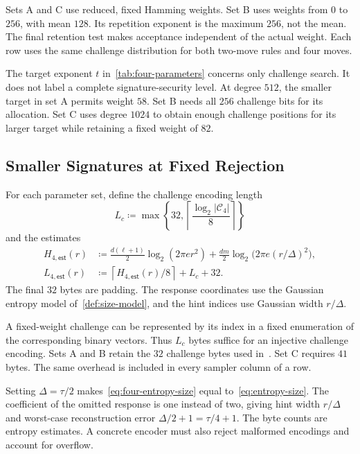 Sets A and C use reduced, fixed Hamming weights. Set B uses weights from $0$ to $256$, with mean $128$. Its repetition exponent is the maximum $256$, not the mean. The final retention test makes acceptance independent of the actual weight. Each row uses the same challenge distribution for both two-move rules and four moves.

The target exponent $t$ in~\cref{tab:four-parameters} concerns only challenge search. It does not label a complete signature-security level. At degree $512$, the smaller target in set A permits weight $58$. Set B needs all $256$ challenge bits for its allocation. Set C uses degree $1024$ to obtain enough challenge positions for its larger target while retaining a fixed weight of $82$.

\subsection{Smaller Signatures at Fixed Rejection}

\begin{definition}
\label{def:four-size}
For each parameter set, define the challenge encoding length
\[
 L_c\coloneqq\max\left\{32,\left\lceil\frac{\log_2|\mathcal C_4|}{8}\right\rceil\right\}
\]
and the estimates
\begin{align}
 H_{4,\mathsf{est}}(r)&\coloneqq
 \frac{d(\ell+1)}2\log_2(2\pi e r^2)
 +\frac{dm}2\log_2\bigl(2\pi e(r/\Delta)^2\bigr),\label{eq:four-entropy-size}\\
 L_{4,\mathsf{est}}(r)&\coloneqq
 \left\lceil H_{4,\mathsf{est}}(r)/8\right\rceil+L_c+32.\label{eq:four-byte-size}
\end{align}
The final $32$ bytes are padding. The response coordinates use the Gaussian entropy model of~\cref{def:size-model}, and the hint indices use Gaussian width $r/\Delta$.
\end{definition}

A fixed-weight challenge can be represented by its index in a fixed enumeration of the corresponding binary vectors. Thus $L_c$ bytes suffice for an injective challenge encoding. Sets A and B retain the $32$ challenge bytes used in~\cite{GartnerFull}. Set C requires $41$ bytes. The same overhead is included in every sampler column of a row.

Setting $\Delta=\tau/2$ makes~\cref{eq:four-entropy-size} equal to~\cref{eq:entropy-size}. The coefficient of the omitted response is one instead of two, giving hint width $r/\Delta$ and worst-case reconstruction error $\Delta/2+1=\tau/4+1$. The byte counts are entropy estimates. A concrete encoder must also reject malformed encodings and account for overflow.

